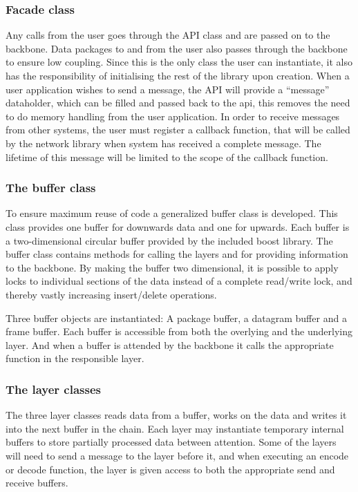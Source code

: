 \subsubsection{Facade class}
Any calls from the user goes through the API class and are passed on to the backbone. Data packages to and from the user also passes through the backbone to ensure low coupling. Since this is the only class the user can instantiate, it also has the responsibility of initialising the rest of the library upon creation.
When a user application wishes to send a message, the API will provide a “message” dataholder, which can be filled and passed back to the api, this removes the need to do memory handling from the user application.
In order to receive messages from other systems, the user must register a callback function, that will be called by the network library when system has received a complete message. The lifetime of this message will be limited to the scope of the callback function.

\subsubsection{The buffer class}
To ensure maximum reuse of code a generalized buffer class is developed. This class provides one buffer for downwards data and one for upwards. Each buffer is a two-dimensional circular buffer provided by the included boost library. The buffer class contains methods for calling the layers and for providing information to the backbone.
By making the buffer two dimensional, it is possible to apply locks to individual sections of the data instead of a complete read/write lock, and thereby vastly increasing insert/delete operations.

Three  buffer objects are instantiated: A package buffer, a datagram buffer and a frame buffer. Each buffer is accessible from both the overlying and the underlying layer. And when a buffer is attended by the backbone it calls the appropriate function in the responsible layer.

\subsubsection{The layer classes}
The three layer classes reads data from a buffer, works on the data and writes it into the next buffer in the chain. Each layer may instantiate temporary internal buffers to store partially processed data between attention. Some of the layers will need to send a message to the layer before it, and when executing an encode or decode function, the layer is given access to both the appropriate send and receive buffers.

